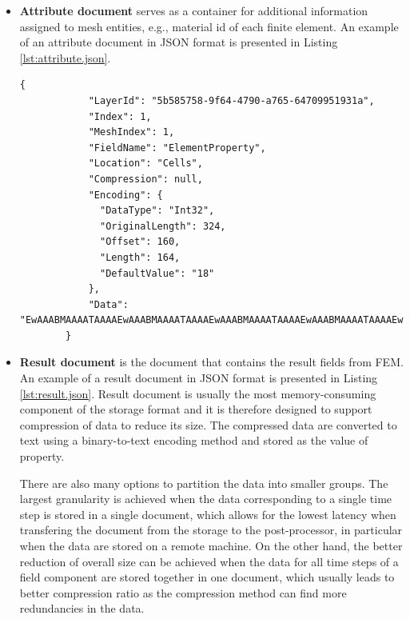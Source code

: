 \begin{itemize}
    \item \textbf{Attribute document} serves as a container for additional information assigned to mesh entities, e.g., material id of each finite element. An example of an attribute document in JSON format is presented in Listing \ref{lst:attribute.json}.

    \begin{lstlisting}[style=json,caption=Example of attribute.json document.,label=lst:attribute.json]
        {
            "LayerId": "5b585758-9f64-4790-a765-64709951931a",
            "Index": 1,
            "MeshIndex": 1,
            "FieldName": "ElementProperty",
            "Location": "Cells",
            "Compression": null,
            "Encoding": {
              "DataType": "Int32",
              "OriginalLength": 324,
              "Offset": 160,
              "Length": 164,
              "DefaultValue": "18"
            },
            "Data": "EwAAABMAAAATAAAAEwAAABMAAAATAAAAEwAAABMAAAATAAAAEwAAABMAAAATAAAAEwAAABMAAAATAAAAEwAAAB..."
        }
    \end{lstlisting}

    \item \textbf{Result document} is the document that contains the result fields from FEM. An example of a result document in JSON format is presented in Listing \ref{lst:result.json}. Result document is usually the most memory-consuming component of the storage format and it is therefore designed to support compression of data to reduce its size. The compressed data are converted to text using a binary-to-text encoding method and stored as the value of  property.

    There are also many options to partition the data into smaller groups. The largest granularity is achieved when the data corresponding to a single time step is stored in a single document, which allows for the lowest latency when transfering the document from the storage to the post-processor, in particular when the data are stored on a remote machine. On the other hand, the better reduction of overall size can be achieved when the data for all time steps of a field component are stored together in one document, which usually leads to better compression ratio as the compression method can find more redundancies in the data.


\end{itemize}
